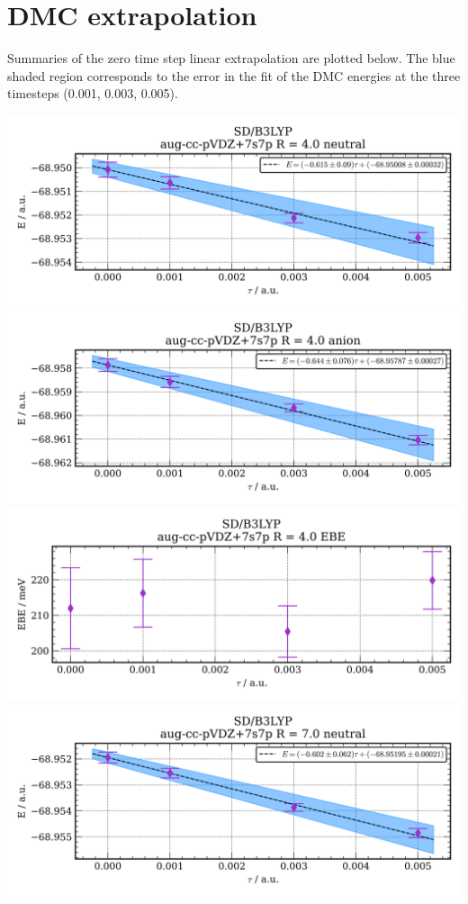\section{DMC extrapolation}
Summaries of the zero time step linear extrapolation are plotted below. The blue shaded region corresponds to the error in the fit of the DMC energies at the three timesteps (0.001, 0.003, 0.005).


\includegraphics[width=\textwidth,keepaspectratio]{images/SDshivB3LYP__aug-cc-pvdz+7s7p__4p0_01_neutral.png}
\includegraphics[width=\textwidth,keepaspectratio]{images/SDshivB3LYP__aug-cc-pvdz+7s7p__4p0_02_anion.png}
\includegraphics[width=\textwidth,keepaspectratio]{images/SDshivB3LYP__aug-cc-pvdz+7s7p__4p0_03_ebe.png}
\includegraphics[width=\textwidth,keepaspectratio]{images/SDshivB3LYP__aug-cc-pvdz+7s7p__7p0_01_neutral.png}
